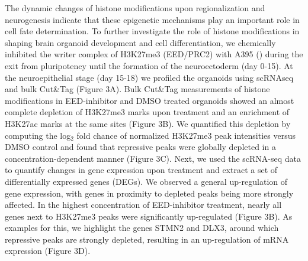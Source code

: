 The dynamic changes of histone modifications upon regionalization and neurogenesis indicate that these epigenetic mechanisms play an important role in cell fate determination. To further investigate the role of histone modifications in shaping brain organoid development and cell differentiation, we chemically inhibited the writer complex of H3K27me3 (EED/PRC2) with A395 (\cite{he_eed_2017}) during the exit from pluripotency until the formation of the neuroectoderm (day 0-15). At the neuroepithelial stage (day 15-18) we profiled the organoids using scRNAseq and bulk Cut\&Tag (Figure 3A). Bulk Cut\&Tag measurements of histone modifications in EED-inhibitor and DMSO treated organoids showed an almost complete depletion of H3K27me3 marks upon treatment and an enrichment of H3K27ac marks at the same sites (Figure 3B). We quantified this depletion by computing the log$_2$ fold chance of normalized H3K27me3 peak intensities versus DMSO control and found that repressive peaks were globally depleted in a concentration-dependent manner (Figure 3C). Next, we used the scRNA-seq data to quantify changes in gene expression upon treatment and extract a set of differentially expressed genes (DEGs). We observed a general up-regulation of gene expression, with genes in proximity to depleted peaks being more strongly affected. In the highest concentration of EED-inhibitor treatment, nearly all genes next to H3K27me3 peaks were significantly up-regulated (Figure 3B). As examples for this, we highlight the genes STMN2 and DLX3, around which repressive peaks are strongly depleted, resulting in an up-regulation of mRNA expression (Figure 3D).

